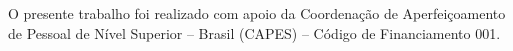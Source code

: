 
\begin{agradecimentos}
  O presente trabalho foi realizado com apoio da Coordenação de Aperfeiçoamento de Pessoal de Nível Superior -- Brasil (CAPES) -- Código de Financiamento 001.
\end{agradecimentos}

